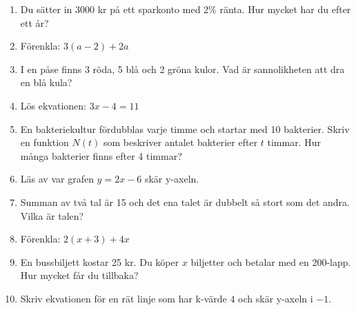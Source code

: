 \documentclass[a4paper,11pt]{article}
\begin{document}
\begin{enumerate}[label=\textbf{B\arabic*.}]
    \item Du sätter in 3000 kr på ett sparkonto med 2\% ränta. Hur mycket har du efter ett år?
    \item Förenkla: $3(a - 2) + 2a$
    \item I en påse finns 3 röda, 5 blå och 2 gröna kulor. Vad är sannolikheten att dra en blå kula?
    \item Lös ekvationen: $3x - 4 = 11$
    \item En bakteriekultur fördubblas varje timme och startar med 10 bakterier. Skriv en funktion $N(t)$ som beskriver antalet bakterier efter $t$ timmar. Hur många bakterier finns efter 4 timmar?
    \item Läs av var grafen $y = 2x - 6$ skär y-axeln.
    \item Summan av två tal är 15 och det ena talet är dubbelt så stort som det andra. Vilka är talen?
    \item Förenkla: $2(x + 3) + 4x$
    \item En bussbiljett kostar 25 kr. Du köper $x$ biljetter och betalar med en 200-lapp. Hur mycket får du tillbaka?
    \item Skriv ekvationen för en rät linje som har k-värde $4$ och skär y-axeln i $-1$.
\end{enumerate}
\end{document}

